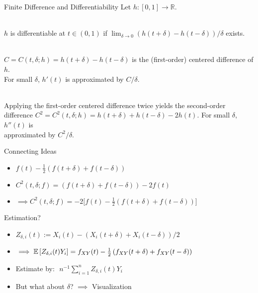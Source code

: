 \begin{frame}{Finite Difference and Differentiability}
    \vspace{-1cm}
    Let $h: [0, 1] \to \mathbb{R}$.

    \vspace{0.25cm}
    \\
        \quad $h$ is differentiable at $t \in (0, 1)$ if
        $\lim_{\delta \to 0} (h(t + \delta) - h(t - \delta)) / \delta$ exists.

    \vspace{0.5cm}
    \\
        \quad $C = C(t, \delta; h) = h(t + \delta) - h(t - \delta)$ is the (first-order)
        centered difference of $h$.\\
        \quad For small $\delta$, $h'(t)$ is approximated by $C / \delta$.

    \vspace{0.5cm}
    \\
        \quad Applying the first-order centered difference twice yields the second-order\\
        \quad difference $C^2 = C^2(t, \delta; h) = h(t + \delta) + h(t - \delta) -
        2h(t)$. For small $\delta$, $h''(t)$ is\\ \quad approximated by $C^2 / \delta$.

\end{frame}


\begin{frame}{Connecting Ideas}

    \begin{itemize}
    \setlength\itemsep{1.5em}
        \item[\labelitem] $f(t) - \frac{1}{2}\left(f(t + \delta) + f(t - \delta)\right)
            $ \pause
        \item[\labelitem] $C^2(t, \delta; f) = \left(f(t + \delta) + f(t -
            \delta)\right) - 2 f(t)$ \pause
        \item[\labelitem] $\implies C^2(t, \delta; f) = - 2 \Big[ f(t) - \frac{1}{2} \left(f(t +
            \delta) + f(t - \delta)\right) \Big]$
    \end{itemize}

\end{frame}


\begin{frame}{Estimation?}
    \begin{itemize}
    \setlength\itemsep{1.5em}
        \item[\labelitem] $Z_{\delta, i}(t) := X_i(t) - \left(X_i(t + \delta) + X_i(t -
            \delta)\right) / 2$
        \item[\labelitem] $\implies \mathbb{E}\left[Z_{\delta, i}(t) Y_i\right] = f_{XY}(t) -
            \frac{1}{2}\left(f_{XY}(t + \delta) + f_{XY}(t - \delta)\right)$
        \item[\labelitem] Estimate by: $\,\, n^{-1}\sum_{i=1}^n Z_{\delta, i}(t) Y_i$ \pause
        \item[\labelitem] But what about $\delta$? \pause $\implies$ Visualization
    \end{itemize}
\end{frame}
